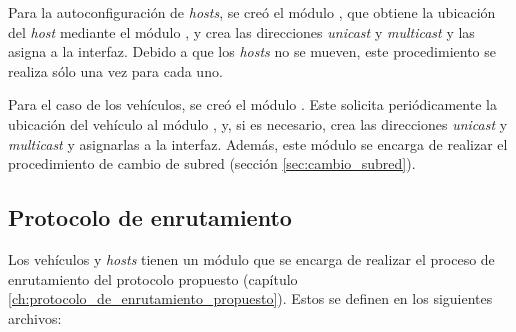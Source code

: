 Para la autoconfiguración de \textit{hosts}, se creó el módulo
, que obtiene la ubicación del \textit{host}
mediante el módulo , y crea las direcciones
\textit{unicast} y \textit{multicast} y las asigna a la interfaz. Debido a que
los \textit{hosts} no se mueven, este procedimiento se realiza sólo una vez para
cada uno.

Para el caso de los vehículos, se creó el módulo . Este
solicita periódicamente la ubicación del vehículo al módulo ,
y, si es necesario, crea las direcciones \textit{unicast} y \textit{multicast} y
asignarlas a la interfaz. Además, este módulo se encarga de realizar el
procedimiento de cambio de subred (sección \ref{sec:cambio_subred}).

\subsection{Protocolo de enrutamiento}
\label{subsec:protocolo_de_enrutamiento_sim}

Los vehículos y \textit{hosts} tienen un módulo que se encarga de realizar el
proceso de enrutamiento del protocolo propuesto (capítulo
\ref{ch:protocolo_de_enrutamiento_propuesto}). Estos se definen en los
siguientes archivos:

